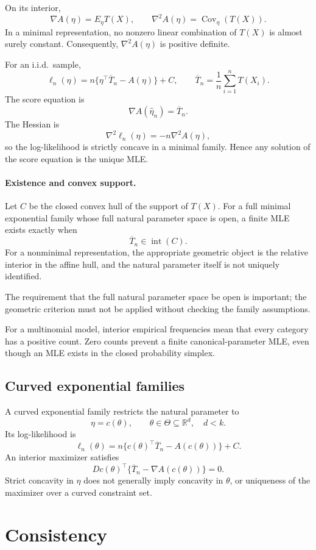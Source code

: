 On its interior,
\[
\nabla A(\eta)=E_\eta T(X),
\qquad
\nabla^2A(\eta)=\operatorname{Cov}_\eta(T(X)).
\]
In a minimal representation, no nonzero linear combination of
$T(X)$ is almost surely constant. Consequently,
$\nabla^2A(\eta)$ is positive definite.

For an i.i.d.\ sample,
\[
\ell_n(\eta)
=
n\{\eta^\top\overline T_n-A(\eta)\}+C,
\qquad
\overline T_n=\frac1n\sum_{i=1}^nT(X_i).
\]
The score equation is
\[
\nabla A(\widehat\eta_n)=\overline T_n.
\]
The Hessian is
\[
\nabla^2\ell_n(\eta)=-n\nabla^2A(\eta),
\]
so the log-likelihood is strictly concave in a minimal family.
Hence any solution of the score equation is the unique MLE.

\paragraph{Existence and convex support.}
Let $C$ be the closed convex hull of the support of $T(X)$.
For a full minimal exponential family whose full natural parameter
space is open, a finite MLE exists exactly when
\[
\overline T_n\in\operatorname{int}(C).
\]
For a nonminimal representation, the appropriate geometric object
is the relative interior in the affine hull, and the natural
parameter itself is not uniquely identified.

The requirement that the full natural parameter space be open is
important; the geometric criterion must not be applied without
checking the family assumptions.

For a multinomial model, interior empirical frequencies mean that
every category has a positive count. Zero counts prevent a finite
canonical-parameter MLE, even though an MLE exists in the closed
probability simplex.

\subsection{Curved exponential families}

A curved exponential family restricts the natural parameter to
\[
\eta=c(\theta),
\qquad
\theta\in\Theta\subseteq\mathbb R^d,
\quad d<k.
\]
Its log-likelihood is
\[
\ell_n(\theta)
=
n\{c(\theta)^\top\overline T_n-A(c(\theta))\}+C.
\]
An interior maximizer satisfies
\[
Dc(\theta)^\top
\{\overline T_n-\nabla A(c(\theta))\}=0.
\]
Strict concavity in $\eta$ does not generally imply concavity in
$\theta$, or uniqueness of the maximizer over a curved constraint
set.

\section{Consistency}

